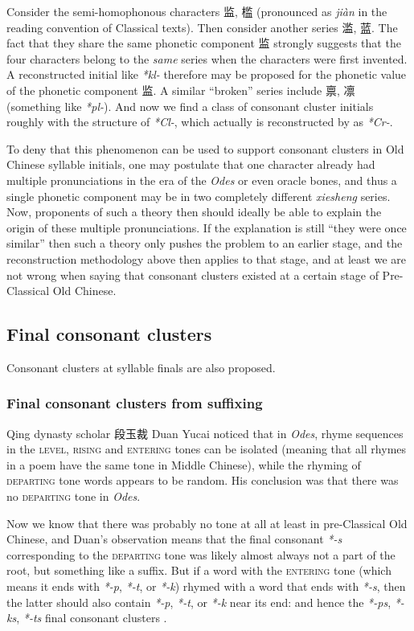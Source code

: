 \documentclass[UTF8, a4paper, oneside, scheme=plain, 12pt]{ctexrep}
\newcommand*{\citepage}[1]{p.~{#1}}
\newcommand*{\citepages}[1]{pp.~{#1}}
\newcommand{\form}[1]{\emph{#1}}
\newcommand{\work}[1]{\textit{#1}}
\newcommand*{\category}[1]{\textsc{#1}}
\begin{document}
Consider the semi-homophonous characters 监, 槛 (pronounced as \form{jiàn} in the reading convention of Classical texts).
Then consider another series 滥, 蓝.
The fact that they share the same phonetic component 监 strongly suggests that the four characters belong to the \emph{same} series when the characters were first invented.
A reconstructed initial like \form{*kl-} therefore may be proposed for the phonetic value of the phonetic component 监.
A similar ``broken'' series include 禀, 凛 (something like \form{*pl-}).
And now we find a class of consonant cluster initials roughly with the structure of \form{*Cl-},
which actually is reconstructed by \citet[\citepages{50-51}]{baxter2014old} as \form{*Cr-}.

To deny that this phenomenon can be used to support consonant clusters in Old Chinese syllable initials, 
one may postulate that one character already had multiple pronunciations in the era of the \work{Odes} or even oracle bones,
and thus a single phonetic component may be in two completely different \form{xiesheng} series.
Now, proponents of such a theory then should ideally be able to explain the origin of these  multiple pronunciations.
If the explanation is still ``they were once similar'' then such a theory only pushes the problem to an earlier stage,
and the reconstruction methodology above then applies to that stage,
and at least we are not wrong when saying that consonant clusters existed at a certain stage of Pre-Classical Old Chinese.

\subsection{Final consonant clusters}

Consonant clusters at syllable finals are also proposed.

\subsubsection{Final consonant clusters from suffixing}

Qing dynasty scholar 段玉裁 Duan Yucai noticed that
in \work{Odes}, rhyme sequences in the \category{level}, \category{rising} and \category{entering} tones
can be isolated (meaning that all rhymes in a poem have the same tone in Middle Chinese),
while the rhyming of \category{departing} tone words appears to be random.
His conclusion was that there was no \category{departing} tone in \work{Odes}.

Now we know that there was probably no tone at all at least in pre-Classical Old Chinese,
and Duan's observation means that
the final consonant \form{*-s} corresponding to the \category{departing} tone
was likely almost always not a part of the root, but something like a suffix.
But if a word with the \category{entering} tone (which means it ends with \form{*-p}, \form{*-t}, or \form{*-k})
rhymed with a word that ends with \form{*-s},
then the latter should also contain \form{*-p}, \form{*-t}, or \form{*-k} near its end:
and hence the \form{*-ps}, \form{*-ks}, \form{*-ts} final consonant clusters
\citep[\citepage{183}]{hill2019historical}.
\end{document}
